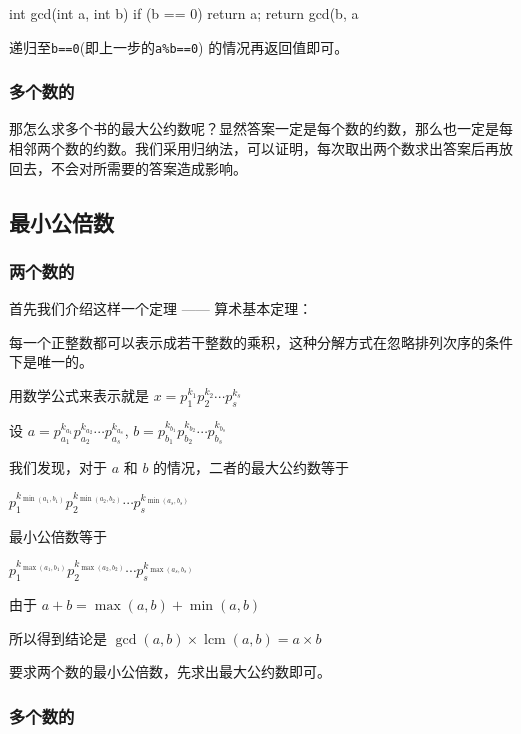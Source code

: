 \begin{cppcode}
int gcd(int a, int b) {
  if (b == 0) return a;
  return gcd(b, a %
}
\end{cppcode}

递归至\texttt{b==0}(即上一步的\texttt{a\%b==0}) 的情况再返回值即可。

\subsubsection{多个数的}

那怎么求多个书的最大公约数呢？显然答案一定是每个数的约数，那么也一定是每相邻两个数的约数。我们采用归纳法，可以证明，每次取出两个数求出答案后再放回去，不会对所需要的答案造成影响。

\subsection{最小公倍数}

\subsubsection{两个数的}

首先我们介绍这样一个定理 —— 算术基本定理：

\begin{QUOTE}{}{}
 每一个正整数都可以表示成若干整数的乘积，这种分解方式在忽略排列次序的条件下是唯一的。
\end{QUOTE}

用数学公式来表示就是 $x = p_1^{k_1}p_2^{k_2} \cdots p_s^{k_s}$

设 $a = p_{a_1}^{k_{a_1}}p_{a_2}^{k_{a_2}} \cdots p_{a_s}^{k_{a_s}}$, $b = p_{b_1}^{k_{b_1}}p_{b_2}^{k_{b_2}} \cdots p_{b_s}^{k_{b_s}}$

我们发现，对于 $a$ 和 $b$ 的情况，二者的最大公约数等于

$p_1^{k_{\min(a_1, b_1)}}p_2^{k_{\min(a_2, b_2)}} \cdots p_s^{k_{\min(a_s, b_s)}}$

最小公倍数等于

$p_1^{k_{\max(a_1, b_1)}}p_2^{k_{\max(a_2, b_2)}} \cdots p_s^{k_{\max(a_s, b_s)}}$

由于 $a + b = \max(a, b) + \min(a, b)$

所以得到结论是 $\gcd(a, b) \times \operatorname{lcm}(a, b) = a \times b$

要求两个数的最小公倍数，先求出最大公约数即可。

\subsubsection{多个数的}

